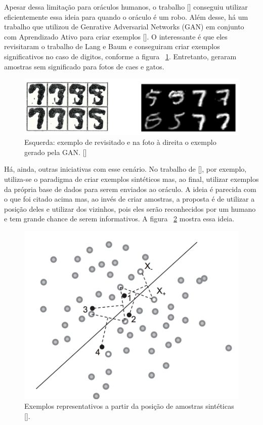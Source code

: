 Apesar dessa limitação para oráculos humanos, o trabalho [\cite{king2004functional, king2009automation}] conseguiu utilizar eficientemente essa ideia para quando o oráculo é um robo. Além desse, há um trabalho que utilizou de Genrative Adversarial Networks (GAN) em conjunto com Aprendizado Ativo para criar exemplos [\cite{zhu2017generative}]. O interessante é que eles revisitaram o trabalho de Lang e Baum e conseguiram criar exemplos significativos no caso de digitos, conforme a figura ~\ref{fig:GAN_5_vs_9}. Entretanto, geraram amostras sem significado para fotos de caes e gatos. 

\begin{figure}
  \centering
  \includegraphics[width=.9\textwidth]{figures/generative_GAN_AL_5_vs_9.png}
  \caption{Esquerda: exemplo de \cite{baum1992query} revisitado e na foto à direita o exemplo gerado pela GAN. [\cite{zhu2017generative}]}
  \label{fig:GAN_5_vs_9}
\end{figure}


Há, ainda, outras iniciativas com esse cenário. No trabalho de [\cite{wang2015active}], por exemplo, utiliza-se o paradigma de criar exemplos sintéticos mas, ao final, utilizar exemplos da própria base de dados para serem enviados ao oráculo. A ideia é parecida com o que foi citado acima mas, ao invés de criar amostras, a proposta é de utilizar a posição deles e utilizar dos vizinhos, pois eles serão reconhecidos por um humano e tem grande chance de serem informativos. A figura ~\ref{fig:wang_2015_membership}  mostra essa ideia. 

\begin{figure}
  \centering
  \includegraphics[width=.5\textwidth]{figures/wang_2015_membership.png}
  \caption{Exemplos representativos a partir da posição de amostras sintéticas [\cite{wang2015active}].}
  \label{fig:wang_2015_membership}
\end{figure}


